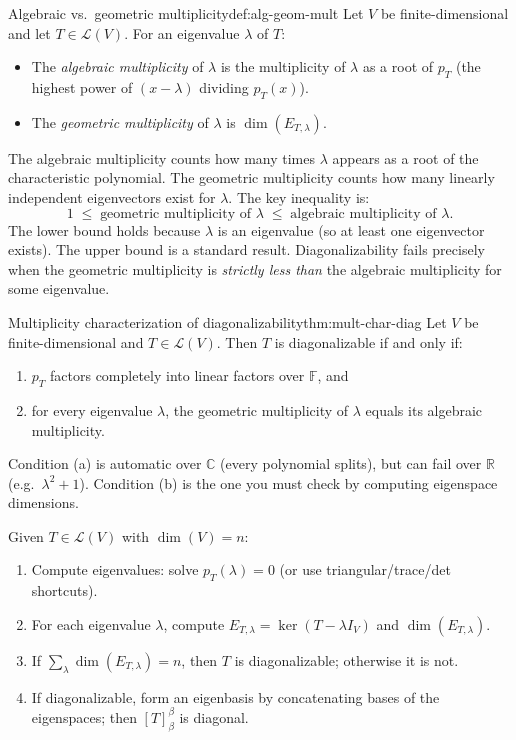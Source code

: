 \begin{definition}{Algebraic vs.\ geometric multiplicity}{def:alg-geom-mult}
Let $V$ be finite-dimensional and let $T\in\mathcal{L}(V)$.
For an eigenvalue $\lambda$ of $T$:
\begin{itemize}[leftmargin=*]
\item The \emph{algebraic multiplicity} of $\lambda$ is the multiplicity of $\lambda$ as a root of $p_T$ (the highest power of $(x-\lambda)$ dividing $p_T(x)$).
\item The \emph{geometric multiplicity} of $\lambda$ is $\dim(E_{T,\lambda})$.
\end{itemize}
\end{definition}

The algebraic multiplicity counts how many times $\lambda$ appears as a root of the characteristic polynomial.
The geometric multiplicity counts how many linearly independent eigenvectors exist for $\lambda$.
The key inequality is:
\[
1 \;\le\; \text{geometric multiplicity of }\lambda \;\le\; \text{algebraic multiplicity of }\lambda.
\]
The lower bound holds because $\lambda$ is an eigenvalue (so at least one eigenvector exists).
The upper bound is a standard result.
Diagonalizability fails precisely when the geometric multiplicity is \emph{strictly less than} the algebraic multiplicity for some eigenvalue.

\begin{theorem}{Multiplicity characterization of diagonalizability}{thm:mult-char-diag}
Let $V$ be finite-dimensional and $T\in\mathcal{L}(V)$. Then $T$ is diagonalizable if and only if:
\begin{enumerate}[label=(\alph*),leftmargin=*]
\item $p_T$ factors completely into linear factors over $\mathbb{F}$, and
\item for every eigenvalue $\lambda$, the geometric multiplicity of $\lambda$ equals its algebraic multiplicity.
\end{enumerate}
\end{theorem}

Condition (a) is automatic over $\mathbb{C}$ (every polynomial splits), but can fail over $\mathbb{R}$ (e.g.\ $\lambda^2+1$).
Condition (b) is the one you must check by computing eigenspace dimensions.

\begin{examtip}[title={Exam Focus: diagonalizability checklist}]
Given $T\in\mathcal{L}(V)$ with $\dim(V)=n$:
\begin{enumerate}[leftmargin=*]
\item Compute eigenvalues: solve $p_T(\lambda)=0$ (or use triangular/trace/det shortcuts).
\item For each eigenvalue $\lambda$, compute $E_{T,\lambda}=\ker(T-\lambda I_V)$ and $\dim(E_{T,\lambda})$.
\item If $\sum_\lambda \dim(E_{T,\lambda})=n$, then $T$ is diagonalizable; otherwise it is not.
\item If diagonalizable, form an eigenbasis by concatenating bases of the eigenspaces; then $[T]_{\beta}^{\beta}$ is diagonal.
\end{enumerate}
\end{examtip}

